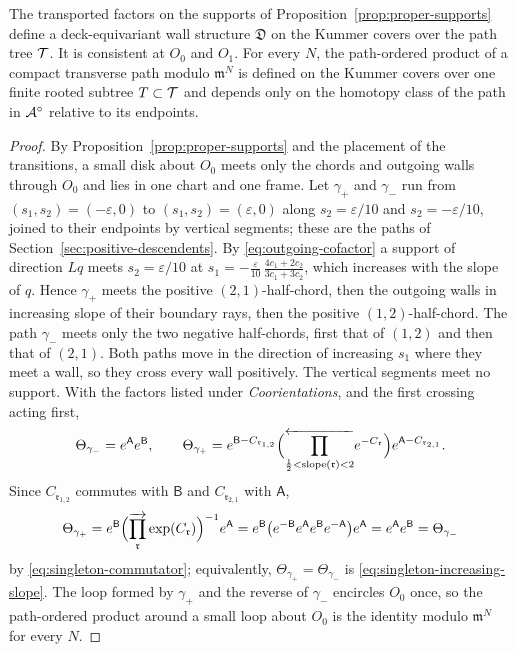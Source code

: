\begin{theorem}\label{thm:annular-consistency}
The transported factors on the supports of
Proposition~\ref{prop:proper-supports} define a deck-equivariant wall
structure $\mathfrak D$ on the Kummer covers over the path tree $\mathcal T$.  It is
consistent at $O_0$ and $O_1$.  For every $N$, the path-ordered product of a
compact transverse path modulo $\mathfrak m^N$ is defined on the Kummer covers over
one finite rooted subtree $T\subset\mathcal T$ and depends only on the homotopy
class of the path in $\mathcal A^\circ$ relative to its endpoints.
\end{theorem}

\begin{proof}
By Proposition~\ref{prop:proper-supports} and the placement of the
transitions, a small disk about $O_0$ meets only the chords and outgoing
walls through $O_0$ and lies in one chart and one frame.  Let $\gamma_+$
and $\gamma_-$ run from $(s_1,s_2)=(-\varepsilon,0)$ to
$(s_1,s_2)=(\varepsilon,0)$ along $s_2=\varepsilon/10$ and
$s_2=-\varepsilon/10$, joined to their endpoints by
vertical segments; these are the paths of
Section~\ref{sec:positive-descendents}.  By \eqref{eq:outgoing-cofactor} a
support of direction $Lq$ meets $s_2=\varepsilon/10$ at
$s_1=-\frac{\varepsilon}{10}\,\frac{4c_1+2c_2}{3c_1+3c_2}$, which
increases with the slope of $q$.  Hence $\gamma_+$ meets the positive
$(2,1)$-half-chord, then the outgoing walls in increasing slope of their
boundary rays, then the
positive $(1,2)$-half-chord.  The path $\gamma_-$ meets only the two negative
half-chords, first that of $(1,2)$ and then that of $(2,1)$.  Both paths
move in the direction of increasing $s_1$ where they meet a wall, so they
cross every wall positively.  The vertical segments meet no support.  With
the factors listed under \emph{Coorientations}, and the first crossing
acting first,
\[
 \Theta_{\gamma_-}=e^{\mathsf A}e^{\mathsf B},
 \qquad
 \Theta_{\gamma_+}
 =e^{\mathsf B-C_{\mathfrak r_{1,2}}}
  \Bigl(\overleftarrow{\prod_{\frac12<\mathrm{slope}(\mathfrak r)<2}}
  e^{-C_{\mathfrak r}}\Bigr)
  e^{\mathsf A-C_{\mathfrak r_{2,1}}}.
\]
Since $C_{\mathfrak r_{1,2}}$ commutes with $\mathsf B$ and
$C_{\mathfrak r_{2,1}}$ with $\mathsf A$,
\[
 \Theta_{\gamma_+}
 =e^{\mathsf B}\Bigl(\overrightarrow{\prod_{\mathfrak r}}
 \exp(C_{\mathfrak r})\Bigr)^{-1}e^{\mathsf A}
 =e^{\mathsf B}\bigl(e^{-\mathsf B}e^{\mathsf A}e^{\mathsf B}e^{-\mathsf A}\bigr)
 e^{\mathsf A}
 =e^{\mathsf A}e^{\mathsf B}=\Theta_{\gamma_-}
\]
by \eqref{eq:singleton-commutator}; equivalently, $\Theta_{\gamma_+}=\Theta_{\gamma_-}$
is \eqref{eq:singleton-increasing-slope}.  The loop formed by $\gamma_+$
and the reverse of $\gamma_-$ encircles $O_0$ once, so the path-ordered
product around a small loop about $O_0$ is the identity modulo $\mathfrak m^N$ for
every $N$.


\end{proof}
